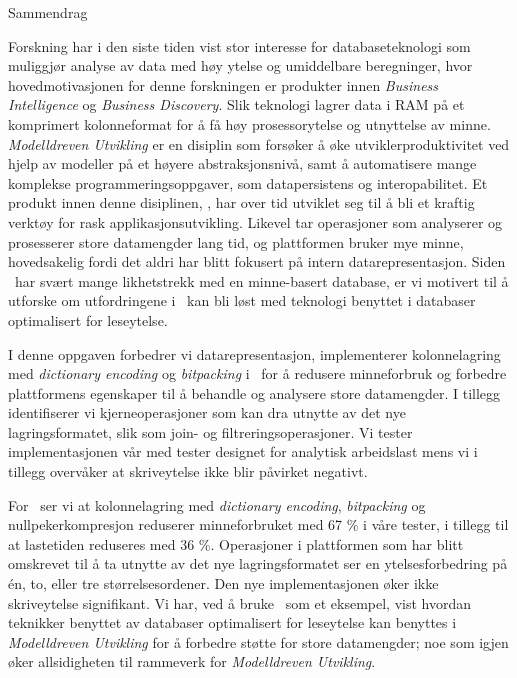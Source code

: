 {\Huge Sammendrag}
\vspace{1cm}

Forskning har i den siste tiden vist stor interesse for databaseteknologi som muliggjør analyse av data med høy ytelse og umiddelbare beregninger, hvor hovedmotivasjonen for denne forskningen er produkter innen \textit{Business Intelligence} og \textit{Business Discovery}. Slik teknologi lagrer data i RAM på et komprimert kolonneformat for å få høy prosessorytelse og utnyttelse av minne. \textit{Modelldreven Utvikling} er en disiplin som forsøker å øke utviklerproduktivitet ved hjelp av modeller på et høyere abstraksjonsnivå, samt å automatisere mange komplekse programmeringsoppgaver, som datapersistens og interopabilitet. Et produkt innen denne disiplinen, \gap, har over tid utviklet seg til å bli et kraftig verktøy for rask applikasjonsutvikling. Likevel tar operasjoner som analyserer og prosesserer store datamengder lang tid, og plattformen bruker mye minne, hovedsakelig fordi det aldri har blitt fokusert på intern datarepresentasjon. Siden \gap~har svært mange likhetstrekk med en minne-basert database, er vi motivert til å utforske om utfordringene i \gap~kan bli løst med teknologi benyttet i databaser optimalisert for leseytelse.

I denne oppgaven forbedrer vi datarepresentasjon, implementerer kolonnelagring med \textit{dictionary encoding} og \textit{bitpacking} i \gap~for å redusere minneforbruk og forbedre plattformens egenskaper til å behandle og analysere store datamengder. I tillegg identifiserer vi kjerneoperasjoner som kan dra utnytte av det nye lagringsformatet, slik som join- og filtreringsoperasjoner. Vi tester implementasjonen vår med tester designet for analytisk arbeidslast mens vi i tillegg overvåker at skriveytelse ikke blir påvirket negativt.

For \gap~ser vi at kolonnelagring med \textit{dictionary encoding}, \textit{bitpacking} og nullpekerkompresjon reduserer minneforbruket med 67 \% i våre tester, i tillegg til at lastetiden reduseres med 36 \%. Operasjoner i plattformen som har blitt omskrevet til å ta utnytte av det nye lagringsformatet ser en ytelsesforbedring på én, to, eller tre størrelsesordener. Den nye implementasjonen øker ikke skriveytelse signifikant. Vi har, ved å bruke \gap~som et eksempel, vist hvordan teknikker benyttet av databaser optimalisert for leseytelse kan benyttes i \textit{Modelldreven Utvikling} for å forbedre støtte for store datamengder; noe som igjen øker allsidigheten til rammeverk for \textit{Modelldreven Utvikling}.

